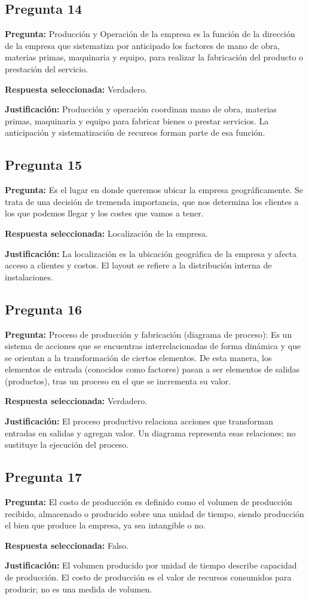 {\subsection{Pregunta 14}
\textbf{Pregunta:} Producción y Operación de la empresa es la función de la dirección de la empresa que sistematiza por anticipado los factores de mano de obra, materias primas, maquinaria y equipo, para realizar la fabricación del producto o prestación del servicio.
\par\textbf{Respuesta seleccionada:} Verdadero.
\par\textbf{Justificación:} Producción y operación coordinan mano de obra, materias primas, maquinaria y equipo para fabricar bienes o prestar servicios. La anticipación y sistematización de recursos forman parte de esa función.
\subsection{Pregunta 15}
\textbf{Pregunta:} Es el lugar en donde queremos ubicar la empresa geográficamente. Se trata de una decisión de tremenda importancia, que nos determina los clientes a los que podemos llegar y los costes que vamos a tener.
\par\textbf{Respuesta seleccionada:} Localización de la empresa.
\par\textbf{Justificación:} La localización es la ubicación geográfica de la empresa y afecta acceso a clientes y costos. El layout se refiere a la distribución interna de instalaciones.
\subsection{Pregunta 16}
\textbf{Pregunta:} Proceso de producción y fabricación (diagrama de proceso): Es un sistema de acciones que se encuentras interrelacionadas de forma dinámica y que se orientan a la transformación de ciertos elementos. De esta manera, los elementos de entrada (conocidos como factores) pasan a ser elementos de salidas (productos), tras un proceso en el que se incrementa su valor.
\par\textbf{Respuesta seleccionada:} Verdadero.
\par\textbf{Justificación:} El proceso productivo relaciona acciones que transforman entradas en salidas y agregan valor. Un diagrama representa esas relaciones; no sustituye la ejecución del proceso.
\subsection{Pregunta 17}
\textbf{Pregunta:} El costo de producción es definido como el volumen de producción recibido, almacenado o producido sobre una unidad de tiempo, siendo producción el bien que produce la empresa, ya sea intangible o no.
\par\textbf{Respuesta seleccionada:} Falso.
\par\textbf{Justificación:} El volumen producido por unidad de tiempo describe capacidad de producción. El costo de producción es el valor de recursos consumidos para producir; no es una medida de volumen.
}
